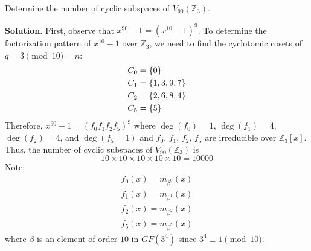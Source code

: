 \begin{Example}{}{}
    Determine the number of cyclic subspaces of $ V_{90}(\mathbb{Z}_3) $.

    \textbf{Solution.} First, observe that $ x^{90}-1=(x^{10}-1)^9 $.
    To determine the factorization pattern of $ x^{10}-1 $
    over $ \mathbb{Z}_3 $, we need to find the cyclotomic cosets
    of $ q=3\pmod{10}=n $:
    \begin{align*}
        C_0 & =\{0\}       \\
        C_1 & =\{1,3,9,7\} \\
        C_2 & =\{2,6,8,4\} \\
        C_5 & =\{5\}
    \end{align*}
    Therefore, $ x^{90}-1=(f_0f_1f_2f_5)^9 $ where
    $ \deg(f_0)=1 $, $ \deg(f_1)=4 $, $ \deg(f_2)=4 $, and $ \deg(f_5=1) $
    and $ f_0,\,f_1,\,f_2,\,f_5 $ are irreducible over $ \mathbb{Z}_3[x] $.
    Thus, the number of cyclic subspaces of $ V_{90}(\mathbb{Z}_3) $
    is
    \[ 10\times 10\times 10\times 10\times 10=10 000 \]
    \underline{Note}:
    \begin{align*}
        f_0(x)=m_{\beta^0}(x) \\
        f_1(x)=m_{\beta^1}(x) \\
        f_2(x)=m_{\beta^2}(x) \\
        f_5(x)=m_{\beta^5}(x)
    \end{align*}
    where $ \beta $ is an element of order $ 10 $ in $ GF(3^4) $
    since $ 3^4\equiv 1\pmod{10} $.
\end{Example}

